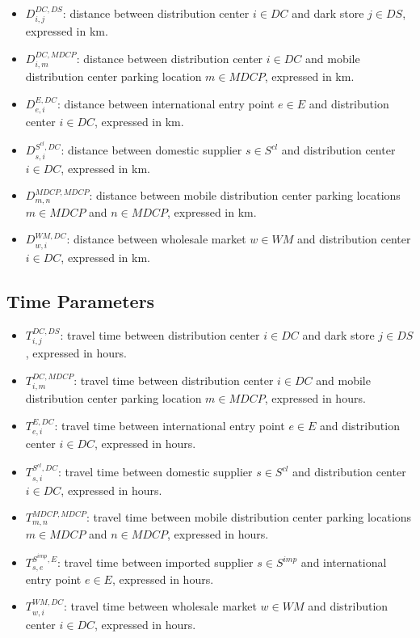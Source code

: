 \documentclass[12pt]{article}
\begin{document}
\begin{itemize}
    \item $D^{DC,DS}_{i,j}$: distance between distribution center $i \in DC$ and dark store $j \in DS$, expressed in km.

    \item $D^{DC,MDCP}_{i,m}$: distance between distribution center $i \in DC$ and mobile distribution center parking location $m \in MDCP$, expressed in km.

    \item $D^{E,DC}_{e,i}$: distance between international entry point $e \in E$ and distribution center $i \in DC$, expressed in km.

    \item $D^{S^{cl},DC}_{s,i}$: distance between domestic supplier $s \in S^{cl}$ and distribution center $i \in DC$, expressed in km.

    \item $D^{MDCP,MDCP}_{m,n}$: distance between mobile distribution center parking locations $m \in MDCP$ and $n \in MDCP$, expressed in km.
    
    \item $D^{WM,DC}_{w,i}$: distance between wholesale market $w \in WM$ and distribution center $i \in DC$, expressed in km.
\end{itemize}

\subsection{Time Parameters}

\begin{itemize}
    \item $T^{DC,DS}_{i,j}$: travel time between distribution center $i \in DC$ and dark store $j \in DS$, expressed in hours.

    \item $T^{DC,MDCP}_{i,m}$: travel time between distribution center $i \in DC$ and mobile distribution center parking location $m \in MDCP$, expressed in hours.

    \item $T^{E,DC}_{e,i}$: travel time between international entry point $e \in E$ and distribution center $i \in DC$, expressed in hours.
    
    \item $T^{S^{cl},DC}_{s,i}$: travel time between domestic supplier $s \in S^{cl}$ and distribution center $i \in DC$, expressed in hours.

    \item $T^{MDCP,MDCP}_{m,n}$: travel time between mobile distribution center parking locations $m \in MDCP$ and $n \in MDCP$, expressed in hours.
    
    \item $T^{S^{imp},E}_{s,e}$: travel time between imported supplier $s \in S^{imp}$ and international entry point $e \in E$, expressed in hours.

    \item $T^{WM,DC}_{w,i}$: travel time between wholesale market $w \in WM$ and distribution center $i \in DC$, expressed in hours.
    
\end{itemize}
\end{document}
